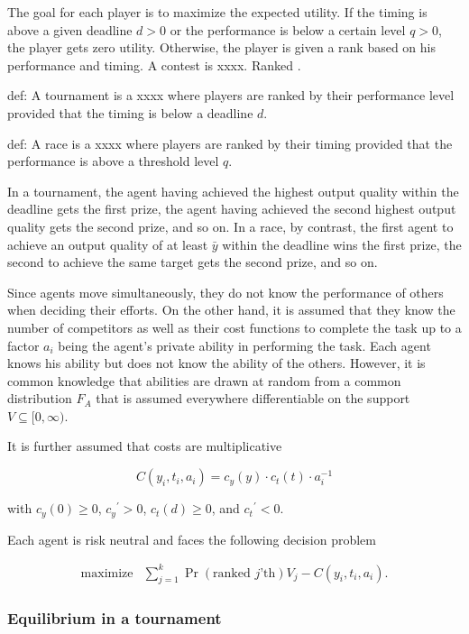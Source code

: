 \documentclass[12pt,]{article}
\begin{document}
The goal for each player is to maximize the expected utility. If the
timing is above a given deadline \(d>0\) or the performance is below a
certain level \(q>0\), the player gets zero utility. Otherwise, the
player is given a rank based on his performance and timing. A contest is
xxxx. Ranked .

def: A tournament is a xxxx where players are ranked by their
performance level provided that the timing is below a deadline \(d\).

def: A race is a xxxx where players are ranked by their timing provided
that the performance is above a threshold level \(q\).

In a tournament, the agent having achieved the highest output quality
within the deadline gets the first prize, the agent having achieved the
second highest output quality gets the second prize, and so on. In a
race, by contrast, the first agent to achieve an output quality of at
least \({\bar y}\) within the deadline wins the first prize, the second
to achieve the same target gets the second prize, and so on.

Since agents move simultaneously, they do not know the performance of
others when deciding their efforts. On the other hand, it is assumed
that they know the number of competitors as well as their cost functions
to complete the task up to a factor \(a_i\) being the agent's private
ability in performing the task. Each agent knows his ability but does
not know the ability of the others. However, it is common knowledge that
abilities are drawn at random from a common distribution \(F_A\) that is
assumed everywhere differentiable on the support
\(V\subseteq [0, \infty)\).

It is further assumed that costs are multiplicative

\[C(y_i, t_i, a_i) = {c_{y}}(y) \cdot {c_{t}}(t)  \cdot a_i^{-1}\]

with \({c_{y}}(0)\geq 0\), \({c_{y}}^\prime>0\), \({c_{t}}(d)\geq 0\),
and \({c_{t}}^\prime<0\).

Each agent is risk neutral and faces the following decision problem

\[\begin{array}{ll}
    \mbox{maximize} & \sum_{j=1}^k \Pr(\text{ranked $j$'th}) V_j  - C(y_i, t_i, a_i).
  \end{array}\]

\subsubsection{Equilibrium in a
tournament}\label{equilibrium-in-a-tournament}
\end{document}
